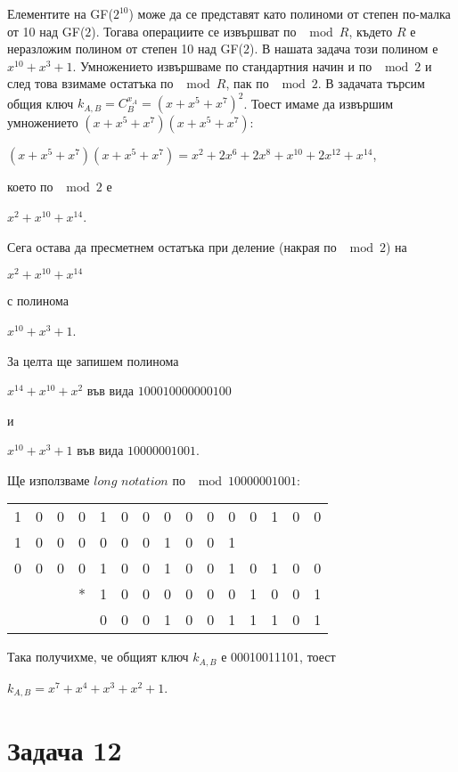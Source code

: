 \documentclass{article}
\begin{document}
\justify
Елементите на GF($2^{10}$) може да се представят като полиноми от степен по-малка от 10 над GF($2$). Тогава операциите се извършват по $\mod R$, където $R$ е неразложим полином от степен 10 над GF($2$). В нашата задача този полином е $x^{10}+x^3+1$. Умножението извършваме по стандартния начин и по $\mod 2$ и след това взимаме остатъка по $\mod R$, пак по $\mod 2$.
\justify
В задачата търсим общия ключ $k_{A,B} = C_B^{x_A} = (x + x^5 + x^7)^2$. Тоест имаме да извършим умножението $(x + x^5 + x^7)(x + x^5 + x^7)$:
\begin{center}
    $(x + x^5 + x^7)(x + x^5 + x^7) = x^2 + 2 x^6 + 2 x^8 + x^{10} + 2 x^{12} + x^{14}$,
\end{center}
което по $\mod 2$ е 
\begin{center}
    $x^2 + x^{10} + x^{14}$.
\end{center}
Сега остава да пресметнем остатъка при деление (накрая по $\mod 2$) на 
\begin{center}
     $x^2 + x^{10} + x^{14}$
\end{center}
с полинома
\begin{center}
    $x^{10}+x^3+1$.
\end{center}
За целта ще запишем полинома 
\begin{center}
    $x^{14}+ x^{10} + x^2$ във вида $100010000000100$
\end{center}
и 
\begin{center}
    $x^{10}+x^3+1$ във вида $10000001001$.
\end{center}
Ще използваме $long$ $notation$ по $\mod 10000001001$:
\begin{center}
    \begin{tabular}{c c c c c c c c c c c c c c c}
        \hline
        1&0&0&0&1&0&0&0&0&0&0&0&1&0&0 \\
        1&0&0&0&0&0&0&1&0&0&1& & & & \\
        \hline
        0&0&0&0&1&0&0&1&0&0&1&0&1&0&0 \\
         & & &*&1&0&0&0&0&0&0&1&0&0&1 \\
        \hline
         & & & &0&0&0&1&0&0&1&1&1&0&1    
    \end{tabular}
\end{center}
Така получихме, че общият ключ $k_{A,B}$ е 00010011101, тоест 
\begin{center}
    $k_{A,B} = x^7+x^4+x^3+x^2+1$.
\end{center}

\section*{Задача 12}
\end{document}
